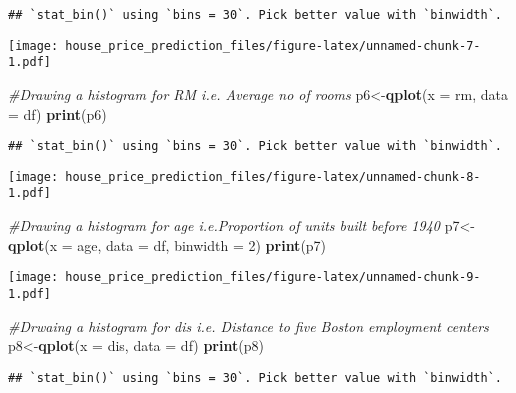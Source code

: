 \documentclass[
]{article}
\newenvironment{Shaded}{\begin{snugshade}}{\end{snugshade}}
\newcommand{\CommentTok}[1]{\textcolor[rgb]{0.56,0.35,0.01}{\textit{#1}}}
\newcommand{\DataTypeTok}[1]{\textcolor[rgb]{0.13,0.29,0.53}{#1}}
\newcommand{\DecValTok}[1]{\textcolor[rgb]{0.00,0.00,0.81}{#1}}
\newcommand{\KeywordTok}[1]{\textcolor[rgb]{0.13,0.29,0.53}{\textbf{#1}}}
\newcommand{\NormalTok}[1]{#1}
\begin{document}
\begin{verbatim}
## `stat_bin()` using `bins = 30`. Pick better value with `binwidth`.
\end{verbatim}

\texttt{[image: house\_price\_prediction\_files/figure-latex/unnamed-chunk-7-1.pdf]}

\begin{Shaded}
\begin{Highlighting}[]
\CommentTok{#Drawing a histogram for RM i.e. Average no of rooms}
\NormalTok{p6<-}\KeywordTok{qplot}\NormalTok{(}\DataTypeTok{x =}\NormalTok{ rm, }\DataTypeTok{data =}\NormalTok{ df)}
\KeywordTok{print}\NormalTok{(p6)}
\end{Highlighting}
\end{Shaded}

\begin{verbatim}
## `stat_bin()` using `bins = 30`. Pick better value with `binwidth`.
\end{verbatim}

\texttt{[image: house\_price\_prediction\_files/figure-latex/unnamed-chunk-8-1.pdf]}

\begin{Shaded}
\begin{Highlighting}[]
\CommentTok{#Drawing a histogram for age i.e.Proportion of units built before 1940}
\NormalTok{p7<-}\KeywordTok{qplot}\NormalTok{(}\DataTypeTok{x =}\NormalTok{ age, }\DataTypeTok{data =}\NormalTok{ df, }\DataTypeTok{binwidth =} \DecValTok{2}\NormalTok{)}
\KeywordTok{print}\NormalTok{(p7)}
\end{Highlighting}
\end{Shaded}

\texttt{[image: house\_price\_prediction\_files/figure-latex/unnamed-chunk-9-1.pdf]}

\begin{Shaded}
\begin{Highlighting}[]
\CommentTok{#Drwaing a histogram for dis i.e. Distance to five Boston employment centers}
\NormalTok{p8<-}\KeywordTok{qplot}\NormalTok{(}\DataTypeTok{x =}\NormalTok{ dis, }\DataTypeTok{data =}\NormalTok{ df)}
\KeywordTok{print}\NormalTok{(p8)}
\end{Highlighting}
\end{Shaded}

\begin{verbatim}
## `stat_bin()` using `bins = 30`. Pick better value with `binwidth`.
\end{verbatim}
\end{document}
